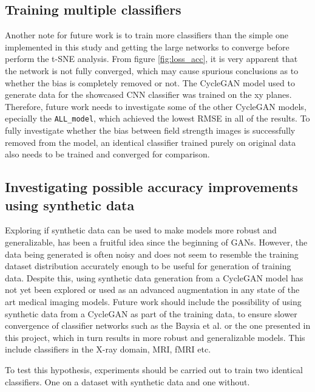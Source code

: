\documentclass[11pt, fleqn, titlepage]{article}
\newcommand{\1}[1]{\mathds{1}\left[#1\right]}
\begin{document}
\subsection{Training multiple classifiers}\label{future_work_mult}


Another note for future work is to train more classifiers than the simple one implemented in this study and getting the large networks to converge before perform the t-SNE analysis. From figure \ref{fig:loss_acc}, it is very apparent that the network is not fully converged, which may cause spurious conclusions as to whether the bias is completely removed or not. The CycleGAN model used to generate data for the showcased CNN classifier was trained on the xy planes. Therefore, future work needs to investigate some of the other CycleGAN models, epecially the \texttt{ALL\_model}, which achieved the lowest RMSE in all of the results. To fully investigate whether the bias between field strength images is successfully removed from the model, an identical classifier trained purely on original data also needs to be trained and converged for comparison.

\subsection{Investigating possible accuracy improvements using synthetic data}

Exploring if synthetic data can be used to make models more robust and generalizable, has been a fruitful idea since the beginning of GANs. However, the data being generated is often  noisy and does not seem to resemble the training dataset distribution accurately enough to be useful for generation of training data. Despite this, using synthetic data generation from a CycleGAN model has not yet been explored or used as an advanced augmentation in any state of the art medical imaging models. %
Future work should include the possibility of using synthetic data from a CycleGAN as part of the training data, to ensure slower convergence of classifier networks such as the Baysia et al. or the one presented in this project, which in turn results in more robust and generalizable models. This include classifiers in the X-ray domain, MRI, fMRI etc.

To test this hypothesis, experiments should be carried out to train two identical classifiers. One on a dataset with synthetic data and one without.
\newpage
\end{document}
